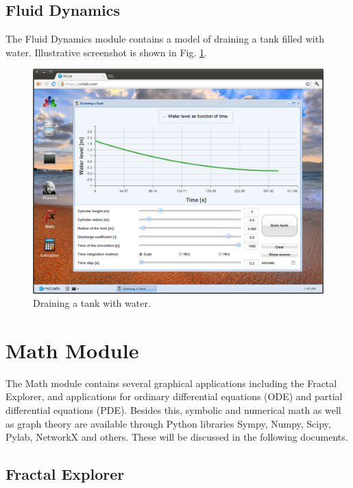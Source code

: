 \documentclass{article}
\begin{document}
\subsection{Fluid Dynamics}

The Fluid Dynamics module contains a model of draining a tank filled with water. 
Illustrative screenshot is shown in Fig. \ref{fig:tank1}.

\newpage

\begin{figure}[!ht]
\begin{center}
\includegraphics[width=\textwidth]{img/tank1.png}
\end{center}
\caption{Draining a tank with water.}
\label{fig:tank1}
\end{figure}



\section{Math Module}

The Math module contains several graphical applications including the Fractal 
Explorer, and applications for ordinary differential equations (ODE) and partial 
differential equations (PDE). Besides this, symbolic and numerical math 
as well as graph theory are available through Python libraries Sympy,
Numpy, Scipy, Pylab, NetworkX and others. These will be discussed in the following 
documents.

\subsection{Fractal Explorer}
\end{document}
